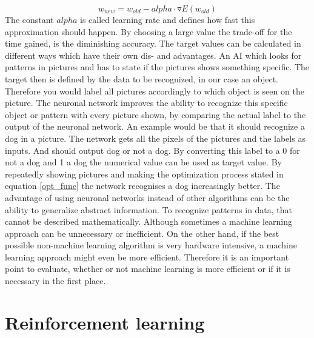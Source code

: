 \documentclass[12pt]{article}
\def\alpha{alpha}%
\begin{document}
\begin{equation} \label{opt_func}
    w_{new} = w_{old} - \alpha \cdot \triangledown E(w_{old})
\end{equation}
The constant $\alpha$ is called \gls{learning rate} and defines how fast this approximation should happen. By choosing a large value the trade-off for the time gained, is the diminishing accuracy. The target values can be calculated in different ways which have their own dis- and advantages. An \gls{AI} which looks for patterns in pictures and has to \gls{state} if the pictures shows something specific. The \gls{target} then is defined by the data to be recognized, in our case an object. Therefore you would label all pictures accordingly to which object is seen on the picture. The \gls{neuronal network} improves the ability to recognize this specific object or pattern with every picture shown, by comparing the actual label to the \gls{output} of the \gls{neuronal network}. An example would be that it should recognize a dog in a picture. The network gets all the pixels of the pictures and the labels as \glspl{input}. And should \gls{output} dog or not a dog. By converting this label to a 0 for not a dog and 1 a dog the numerical value can be used as target value. By repeatedly showing pictures and making the optimization process stated in equation \ref{opt_func} the network recognises a dog increasingly better.
The advantage of using \glspl{neuronal network} instead of other algorithms can be the ability to generalize abstract information. To recognize patterns in data, that cannot be described mathematically. Although sometimes a \gls{machine learning} approach can be unnecessary or inefficient. On the other hand, if the best possible non-\gls{machine learning} algorithm is very hardware intensive, a \gls{machine learning} approach might even be more efficient. Therefore it is an important point to evaluate, whether or not \gls{machine learning} is more efficient or if it is necessary in the first place.
\section{Reinforcement learning}
\end{document}

